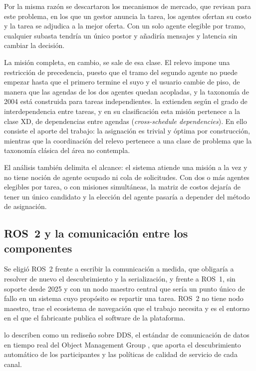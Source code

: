Por la misma razón se descartaron los mecanismos de mercado, que \textcite{quinton2023market}
revisan para este problema, en los que un gestor anuncia la tarea, los agentes ofertan su costo
y la tarea se adjudica a la mejor oferta. Con un solo agente elegible por tramo, cualquier subasta
tendría un único postor y añadiría mensajes y latencia sin cambiar la decisión.

La misión completa, en cambio, se sale de esa clase. El relevo impone una restricción de
precedencia, puesto que el tramo del segundo agente no puede empezar hasta que el primero termine
el suyo y el usuario cambie de piso, de manera que las agendas de los dos agentes quedan acopladas,
y la taxonomía de 2004 está construida para tareas independientes.
\textcite{korsah2013comprehensive} la extienden según el grado de interdependencia entre tareas, y
en su clasificación esta misión pertenece a la clase XD, de dependencias entre agendas
(\textit{cross-schedule dependencies}). En ello consiste el aporte del trabajo: la asignación es
trivial y óptima por construcción, mientras que la coordinación del relevo pertenece a una clase de
problema que la taxonomía clásica del área no contempla.

El análisis también delimita el alcance: el sistema atiende una misión a la vez y no tiene
noción de agente ocupado ni cola de solicitudes. Con dos o más agentes elegibles por tarea, o con
misiones simultáneas, la matriz de costos dejaría de tener un único candidato y la elección del
agente pasaría a depender del método de asignación.

\subsection{ROS~2 y la comunicación entre los componentes}
\label{sec:teo-ros2}

Se eligió ROS~2 frente a escribir la comunicación a medida, que obligaría a resolver de nuevo el
descubrimiento y la serialización, y frente a ROS~1, sin soporte desde 2025 y con un nodo maestro
central que sería un punto único de fallo en un sistema cuyo propósito es repartir una tarea. ROS~2
no tiene nodo maestro, trae el ecosistema de navegación que el trabajo necesita y es el entorno en
el que el fabricante publica el software de la plataforma.

\textcite{macenski2022ros2} lo describen como un rediseño sobre DDS, el estándar de comunicación de
datos en tiempo real del Object Management Group \autocite{omg2015dds}, que aporta el descubrimiento
automático de los participantes y las políticas de calidad de servicio de cada canal.

